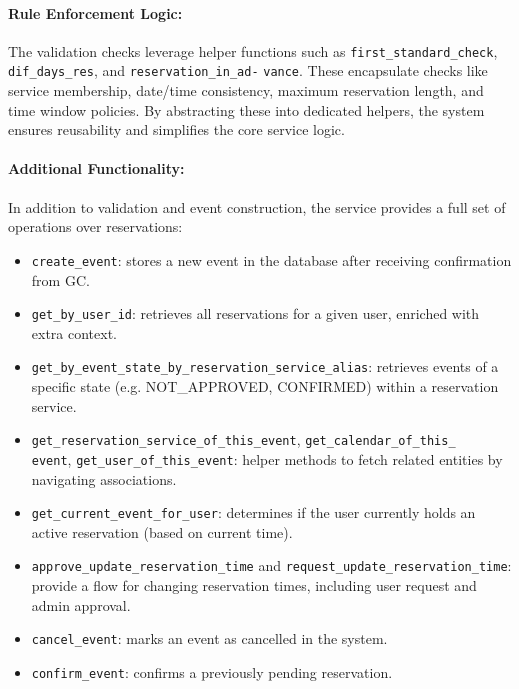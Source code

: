\paragraph{Rule Enforcement Logic:}
The validation checks leverage helper functions such as \texttt{first\_standard\_check}, \texttt{dif\_days\_res}, and \texttt{reservation\_in\_ad-} \texttt{vance}. These encapsulate checks like service membership, date/time consistency, maximum reservation length, and time window policies. By abstracting these into dedicated helpers, the system ensures reusability and simplifies the core service logic.

\paragraph{Additional Functionality:}
In addition to validation and event construction, the service provides a full set of operations over reservations: 

\begin{itemize}
  \item \texttt{create\_event}: stores a new event in the database after receiving confirmation from GC.
  \item \texttt{get\_by\_user\_id}: retrieves all reservations for a given user, enriched with extra context.
  \item \texttt{get\_by\_event\_state\_by\_reservation\_service\_alias}: retrieves events of a specific state (e.g. NOT\_APPROVED, CONFIRMED) within a reservation service.
  \item \texttt{get\_reservation\_service\_of\_this\_event}, \texttt{get\_calendar\_of\_this\_}\\ \texttt{event}, \texttt{get\_user\_of\_this\_event}: helper methods to fetch related entities by navigating associations.
  \item \texttt{get\_current\_event\_for\_user}: determines if the user currently holds an active reservation (based on current time).
  \item \texttt{approve\_update\_reservation\_time} and \texttt{request\allowbreak\_update\allowbreak\_reservation\allowbreak\_time}: provide a flow for changing reservation times, including user request and admin approval.
  \item \texttt{cancel\_event}: marks an event as cancelled in the system.
  \item \texttt{confirm\_event}: confirms a previously pending reservation.
\end{itemize}

